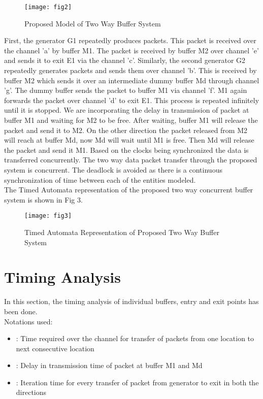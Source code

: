 \documentclass[letterpaper]{article}
\begin{document}
\begin{figure}[bpht!]
\centering
	\texttt{[image: fig2]}
	\caption{Proposed Model of Two Way Buffer System}
	\label{Fig2}
\end{figure}
	
First, the generator G1 repeatedly produces packets. This packet is received over the channel 'a' by buffer M1. The packet is received by buffer M2 over channel 'e' and sends it to exit E1 via the channel 'c'. Similarly, the second generator G2 repeatedly generates packets and sends them over channel 'b'. This is received by buffer M2 which sends it over an intermediate dummy buffer Md through channel 'g'. The dummy buffer sends the packet to buffer M1 via channel 'f'. M1 again forwards the packet over channel 'd' to exit E1. This process is repeated infinitely until it is stopped. We are incorporating the delay  in transmission of packet at buffer M1 and waiting for M2 to be free. After waiting, buffer M1 will release the packet and send it to M2. On the other direction the packet released from M2 will reach at buffer Md, now Md will wait until M1 is free. Then Md will release the packet and send it M1. Based on the clocks being synchronized the data is transferred concurrently. The two way data packet transfer through the proposed system is concurrent. The deadlock is avoided as there is a continuous synchronization of time between each of the entities modeled. \\ 
The Timed Automata representation of the proposed two way concurrent buffer system is shown in Fig 3. 

\begin{figure}[bpht!]
\centering
	\texttt{[image: fig3]}
	\caption{Timed Automata Representation of Proposed Two Way Buffer System}
\end{figure}
	





\section{Timing Analysis}
\label{7}
In this section, the timing analysis of individual buffers, entry and exit points has been done.\\
Notations used:
\begin{itemize}
	\item  : Time required over the channel for transfer of packets from one location to next consecutive location
	\item  : Delay in transmission time of packet at buffer M1 and Md
	\item  : Iteration time for every transfer of packet from generator to exit in both the directions
\end{itemize}
\end{document}
